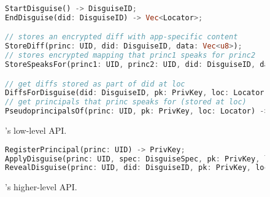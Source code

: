 \begin{figure}[t]
\begin{lstlisting}[language=Rust, style=rust]
StartDisguise() -> DisguiseID;
EndDisguise(did: DisguiseID) -> Vec<Locator>;

// stores an encrypted diff with app-specific content
StoreDiff(princ: UID, did: DisguiseID, data: Vec<u8>);
// stores encrypted mapping that princ1 speaks for princ2
StoreSpeaksFor(princ1: UID, princ2: UID, did: DisguiseID, data: Vec<u8>);

// get diffs stored as part of did at loc
DiffsForDisguise(did: DisguiseID, pk: PrivKey, loc: Locator) -> Vec<Vec<u8>>;
// get principals that princ speaks for (stored at loc)
PseudoprincipalsOf(princ: UID, pk: PrivKey, loc: Locator) -> Vec<UID>;
\end{lstlisting}
\caption{\sys's low-level API.}
\label{f:api-low}
\end{figure}

\begin{figure}[t]
\begin{lstlisting}[language=Rust, style=rust]
RegisterPrincipal(princ: UID) -> PrivKey;
ApplyDisguise(princ: UID, spec: DisguiseSpec, pk: PrivKey, locs: Vec<Locator>) -> (DisguiseID, Vec<Locator>);
RevealDisguise(princ: UID, did: DisguiseID, pk: PrivKey, locs: Locator);
\end{lstlisting}
\caption{\sys's higher-level API.}
\label{f:api-high}
\end{figure}
